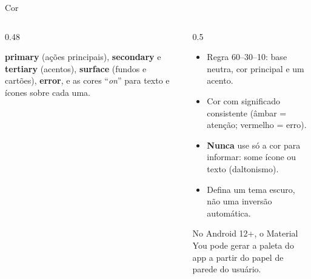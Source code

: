 \documentclass[aspectratio=169,10pt]{beamer}
\begin{document}
\begin{frame}{Cor}
  \begin{columns}[T]
    \begin{column}{0.48\textwidth}
      \begin{conceito}
        \textbf{primary} (ações principais), \textbf{secondary} e \textbf{tertiary} (acentos), \textbf{surface} (fundos e cartões), \textbf{error}, e as cores ``\emph{on}'' para texto e ícones sobre cada uma.
      \end{conceito}
      \centering
    \end{column}
    \begin{column}{0.5\textwidth}
      \begin{conceito}
        \begin{itemize}
          \item Regra 60--30--10: base neutra, cor principal e um acento.
          \item Cor com significado consistente (âmbar = atenção; vermelho = erro).
          \item \textbf{Nunca} use só a cor para informar: some ícone ou texto (daltonismo).
          \item Defina um tema escuro, não uma inversão automática.
        \end{itemize}
      \end{conceito}
      \begin{dica}
        No Android 12+, o Material You pode gerar a paleta do app a partir do papel de parede do usuário.
      \end{dica}
    \end{column}
  \end{columns}
\end{frame}
\end{document}
